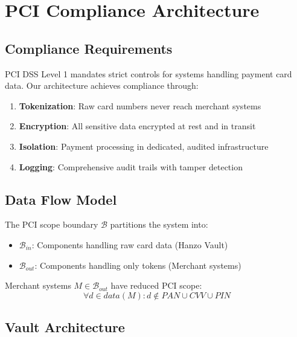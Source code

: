 \section{PCI Compliance Architecture}


\subsection{Compliance Requirements}

PCI DSS Level 1 mandates strict controls for systems handling payment card data. Our architecture achieves compliance through:

\begin{enumerate}
    \item \textbf{Tokenization}: Raw card numbers never reach merchant systems
    \item \textbf{Encryption}: All sensitive data encrypted at rest and in transit
    \item \textbf{Isolation}: Payment processing in dedicated, audited infrastructure
    \item \textbf{Logging}: Comprehensive audit trails with tamper detection
\end{enumerate}

\subsection{Data Flow Model}

\begin{definition}
The PCI scope boundary $\mathcal{B}$ partitions the system into:
\begin{itemize}
    \item $\mathcal{B}_{in}$: Components handling raw card data (Hanzo Vault)
    \item $\mathcal{B}_{out}$: Components handling only tokens (Merchant systems)
\end{itemize}
\end{definition}

\begin{theorem}
Merchant systems $M \in \mathcal{B}_{out}$ have reduced PCI scope:
\[
\forall d \in data(M) : d \notin PAN \cup CVV \cup PIN
\]
\end{theorem}

\subsection{Vault Architecture}

